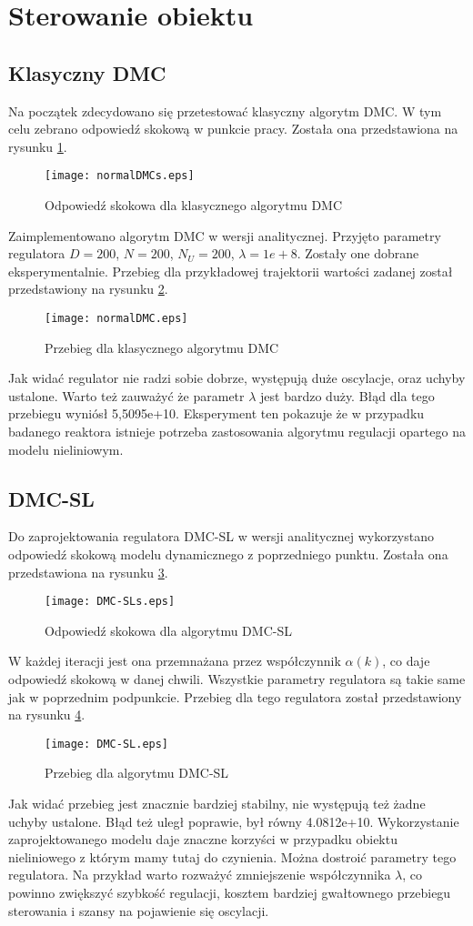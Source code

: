 \newpage
\section{Sterowanie obiektu}
\subsection{Klasyczny DMC}
Na początek zdecydowano się przetestować klasyczny algorytm DMC. W tym celu zebrano odpowiedź skokową w punkcie pracy. Została ona przedstawiona na rysunku \ref{fig:normalDMCs}.
\begin{figure}[!h]
	\centering \texttt{[image: normalDMCs.eps]}
	\caption{Odpowiedź skokowa dla klasycznego algorytmu DMC}
	\label{fig:normalDMCs}
\end{figure}
Zaimplementowano algorytm DMC w wersji analitycznej. Przyjęto parametry regulatora $D =200$, $N= 200$, $N_U = 200$, $\lambda=1e+8$. Zostały one dobrane eksperymentalnie. Przebieg dla przykładowej trajektorii wartości zadanej został przedstawiony na rysunku \ref{fig:normalDMC}.
\begin{figure}[!h]
	\centering \texttt{[image: normalDMC.eps]}
	\caption{Przebieg dla klasycznego algorytmu DMC}
	\label{fig:normalDMC}
\end{figure}

Jak widać regulator nie radzi sobie dobrze, występują duże oscylacje, oraz uchyby ustalone. Warto też zauważyć że parametr $\lambda$ jest bardzo duży. Błąd dla tego przebiegu wyniósł 5,5095e+10. Eksperyment ten pokazuje że w przypadku badanego reaktora istnieje potrzeba zastosowania algorytmu regulacji opartego na modelu nieliniowym.

\subsection{DMC-SL}
Do zaprojektowania regulatora DMC-SL w wersji analitycznej wykorzystano odpowiedź skokową modelu dynamicznego z poprzedniego punktu. Została ona przedstawiona na rysunku \ref{fig:DMC-SLs}.
\begin{figure}[H]
	\centering \texttt{[image: DMC-SLs.eps]}
	\caption{Odpowiedź skokowa dla algorytmu DMC-SL}
	\label{fig:DMC-SLs}
\end{figure}
W każdej iteracji jest ona przemnażana przez współczynnik $\alpha(k)$, co daje odpowiedź skokową w danej chwili. Wszystkie parametry regulatora są takie same jak w poprzednim podpunkcie. Przebieg dla tego regulatora został przedstawiony na rysunku \ref{fig:DMC-SL}.
\begin{figure}[H]
	\centering \texttt{[image: DMC-SL.eps]}
	\caption{Przebieg dla algorytmu DMC-SL}
	\label{fig:DMC-SL}
\end{figure}
Jak widać przebieg jest znacznie bardziej stabilny, nie występują też żadne uchyby ustalone. Błąd też uległ poprawie, był równy 4.0812e+10. Wykorzystanie zaprojektowanego modelu daje znaczne korzyści w przypadku obiektu nieliniowego z którym mamy tutaj do czynienia. Można dostroić parametry tego regulatora. Na przykład warto rozważyć zmniejszenie współczynnika $\lambda$, co powinno zwiększyć szybkość regulacji, kosztem bardziej gwałtownego przebiegu sterowania i szansy na pojawienie się oscylacji.